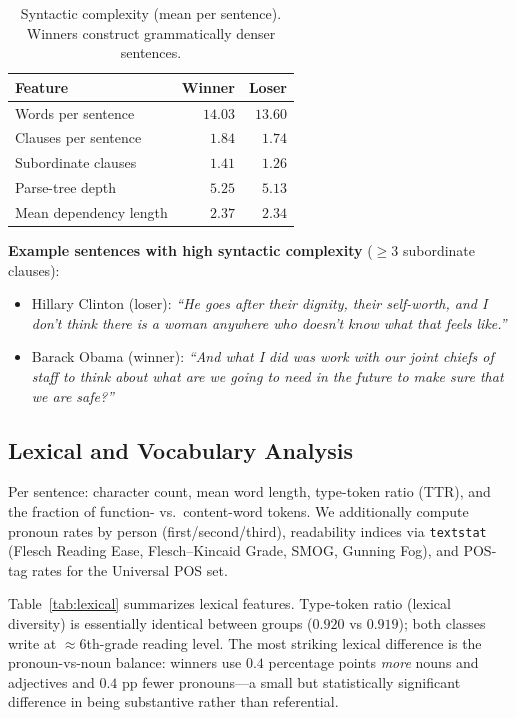 \documentclass[journal]{IEEEtran}
\newcommand{\winner}{\textcolor[HTML]{1B5E20}}
\newcommand{\loser}{\textcolor[HTML]{B71C1C}}
\begin{document}
\begin{table}[t]
\caption{Syntactic complexity (mean per sentence). Winners
construct grammatically denser sentences.}
\label{tab:syntactic_complexity}
\centering
\begin{tabular}{lrr}
\toprule
Feature                       & Winner & Loser \\
\midrule
Words per sentence            & $14.03$ & $13.60$ \\
Clauses per sentence          & $1.84$  & $1.74$ \\
Subordinate clauses           & $1.41$  & $1.26$ \\
Parse-tree depth              & $5.25$  & $5.13$ \\
Mean dependency length        & $2.37$  & $2.34$ \\
\bottomrule
\end{tabular}
\end{table}

\noindent\textbf{Example sentences with high syntactic complexity}
($\geq 3$ subordinate clauses):
\begin{itemize}\itemsep0pt
  \item \loser{Hillary Clinton (loser):} \emph{``He goes after their
        dignity, their self-worth, and I don't think there is a
        woman anywhere who doesn't know what that feels like.''}
  \item \winner{Barack Obama (winner):} \emph{``And what I did was
        work with our joint chiefs of staff to think about what are
        we going to need in the future to make sure that we are
        safe?''}
\end{itemize}

\subsection{Lexical and Vocabulary Analysis}

Per sentence: character count, mean word length, type-token ratio
(TTR), and the fraction of function- vs.\ content-word tokens.
We additionally compute pronoun rates by person
(first/second/third), readability indices via \texttt{textstat}
(Flesch Reading Ease, Flesch--Kincaid Grade, SMOG, Gunning Fog),
and POS-tag rates for the Universal POS set.

Table~\ref{tab:lexical} summarizes lexical features. Type-token
ratio (lexical diversity) is essentially identical between groups
($0.920$ vs $0.919$); both classes write at $\approx 6$th-grade
reading level. The most striking lexical difference is the
pronoun-vs-noun balance: winners use $0.4$ percentage points
\emph{more} nouns and adjectives and $0.4$ pp fewer pronouns---a
small but statistically significant difference in being
substantive rather than referential.
\end{document}

